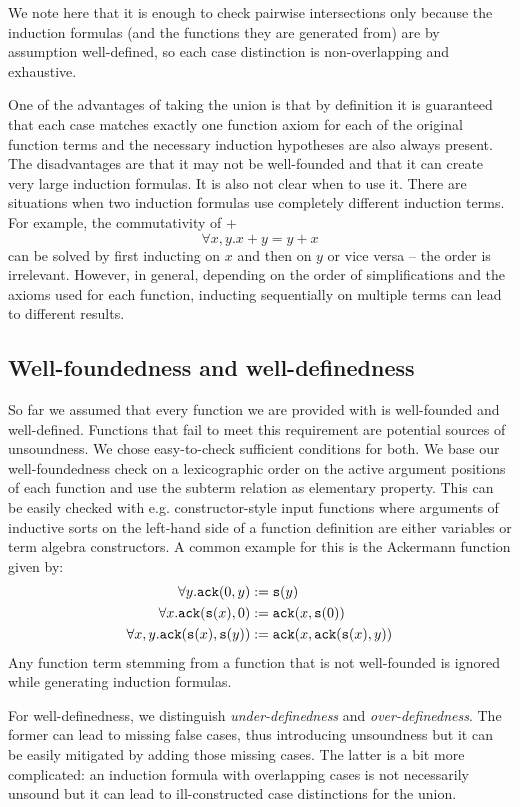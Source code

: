 We note here that it is enough to check pairwise intersections only because the induction formulas (and the functions they are generated from) are by assumption well-defined, so each case distinction is non-overlapping and exhaustive.

One of the advantages of taking the union is that by definition it is guaranteed that each case matches exactly one function axiom for each of the original function terms and the necessary induction hypotheses are also always present. The disadvantages are that it may not be well-founded and that it can create very large induction formulas. It is also not clear when to use it. There are situations when two induction formulas use completely different induction terms. For example, the commutativity of +
$$\forall x,y.x+y=y+x$$
can be solved by first inducting on $x$ and then on $y$ or vice versa -- the order is irrelevant. However, in general, depending on the order of simplifications and the axioms used for each function, inducting sequentially on multiple terms can lead to different results.


\subsection{Well-foundedness and well-definedness}
So far we assumed that every function we are provided with is well-founded and well-defined. Functions that fail to meet this requirement are potential sources of unsoundness. We chose easy-to-check sufficient conditions for both. We base our well-foundedness check on a lexicographic order on the active argument positions of each function and use the subterm relation as elementary property. This can be easily checked with e.g. constructor-style input functions where arguments of inductive sorts on the left-hand side of a function definition are either variables or term algebra constructors. A common example for this is the Ackermann function given by:
$$\begin{aligned}\forall y. \mathtt{ack}(0,y)&:=\mathtt{s}(y)\\
\forall x.\mathtt{ack}(\mathtt{s}(x),0)&:=\mathtt{ack}(x,\mathtt{s}(0))\\
\forall x,y.\mathtt{ack}(\mathtt{s}(x),\mathtt{s}(y))&:=\mathtt{ack}(x,\mathtt{ack}(\mathtt{s}(x),y))\end{aligned}$$
Any function term stemming from a function that is not well-founded is ignored while generating induction formulas.

For well-definedness, we distinguish \textit{under-definedness} and \textit{over-definedness}. The former can lead to missing false cases, thus introducing unsoundness but it can be easily mitigated by adding those missing cases. The latter is a bit more complicated: an induction formula with overlapping cases is not necessarily unsound but it can lead to ill-constructed case distinctions for the union. 

